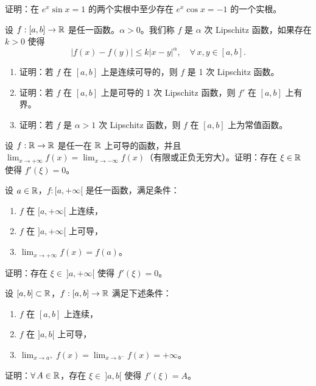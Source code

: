 \begin{exercise}
	\item 证明：在 \(e^x\sin x=1\) 的两个实根中至少存在 \(e^x\cos x=-1\) 的一个实根。
\end{exercise}

\begin{exercise}
	\item 设 \(f:[a,b]\to\mathbb{R}\) 是任一函数。\(\alpha>0\)。我们称 \(f\) 是 \(\alpha\) 次 Lipschitz 函数，如果存在 \(k>0\) 使得
	\[
	|f(x)-f(y)|\le k|x-y|^\alpha,\quad\forall\,x,y\in[a,b].
	\]
	\begin{enumerate}[label=\arabic*)]
		\item 证明：若 \(f\) 在 \([a,b]\) 上是连续可导的，则 \(f\) 是 1 次 Lipschitz 函数。
		\item 证明：若 \(f\) 在 \([a,b]\) 上是可导的 1 次 Lipschitz 函数，则 \(f'\) 在 \([a,b]\) 上有界。
		\item 证明：若 \(f\) 是 \(\alpha>1\) 次 Lipschitz 函数，则 \(f\) 在 \([a,b]\) 上为常值函数。
	\end{enumerate}
\end{exercise}

\begin{exercise}
	\item 设 \(f:\mathbb{R}\to\mathbb{R}\) 是任一在 \(\mathbb{R}\) 上可导的函数，并且 \(\lim_{x\to+\infty}f(x)=\lim_{x\to-\infty}f(x)\)（有限或正负无穷大）。证明：存在 \(\xi\in\mathbb{R}\) 使得 \(f'(\xi)=0\)。
\end{exercise}

\begin{exercise}
	\item 设 \(a\in\mathbb{R}\)，\(f:[a,+\infty[\) 是任一函数，满足条件：
	\begin{enumerate}[label=\arabic*)]
		\item \(f\) 在 \([a,+\infty[\) 上连续，
		\item \(f\) 在 \(]a,+\infty[\) 上可导，
		\item \(\lim_{x\to+\infty}f(x)=f(a)\)。
	\end{enumerate}
	证明：存在 \(\xi\in\ ]a,+\infty[\) 使得 \(f'(\xi)=0\)。
\end{exercise}

\begin{exercise}
	\item 设 \([a,b]\subset\mathbb{R}\)，\(f:[a,b]\to\mathbb{R}\) 满足下述条件：
	\begin{enumerate}[label=\arabic*)]
		\item \(f\) 在 \([a,b]\) 上连续，
		\item \(f\) 在 \(]a,b[\) 上可导，
		\item \(\lim_{x\to a^+}f(x)=\lim_{x\to b^-}f(x)=+\infty\)。
	\end{enumerate}
	证明：\(\forall\,A\in\mathbb{R}\)，存在 \(\xi\in\ ]a,b[\) 使得 \(f'(\xi)=A\)。
\end{exercise}

